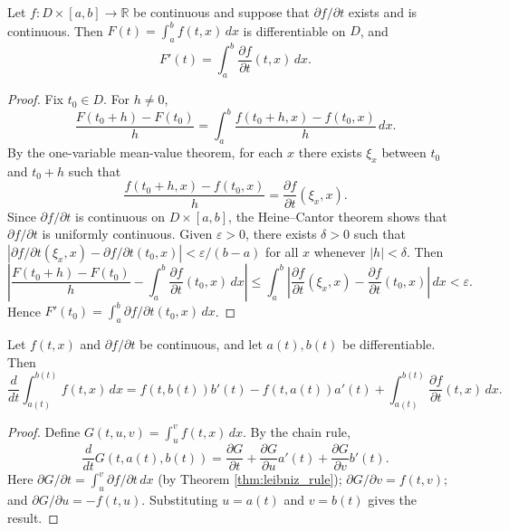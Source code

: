 \begin{theorem}\label{thm:leibniz_rule}
Let $f: D \times [a, b] \to \mathbb{R}$ be continuous and suppose that $\partial f/\partial t$ exists and is continuous. Then $F(t) = \int_a^b f(t, x) \, dx$ is differentiable on $D$, and
\[
F'(t) = \int_a^b \frac{\partial f}{\partial t}(t, x) \, dx.
\]
\end{theorem}

\begin{proof}
Fix $t_0 \in D$. For $h \neq 0$,
\[
\frac{F(t_0 + h) - F(t_0)}{h} = \int_a^b \frac{f(t_0 + h, x) - f(t_0, x)}{h} \, dx.
\]
By the one-variable mean-value theorem, for each $x$ there exists $\xi_x$ between $t_0$ and $t_0 + h$ such that
\[
\frac{f(t_0 + h, x) - f(t_0, x)}{h} = \frac{\partial f}{\partial t}(\xi_x, x).
\]
Since $\partial f/\partial t$ is continuous on $D \times [a, b]$, the Heine--Cantor theorem shows that $\partial f/\partial t$ is uniformly continuous. Given $\varepsilon > 0$, there exists $\delta > 0$ such that $|\partial f/\partial t(\xi_x, x) - \partial f/\partial t(t_0, x)| < \varepsilon/(b - a)$ for all $x$ whenever $|h| < \delta$. Then
\[
\left| \frac{F(t_0 + h) - F(t_0)}{h} - \int_a^b \frac{\partial f}{\partial t}(t_0, x) \, dx \right| \le \int_a^b \left| \frac{\partial f}{\partial t}(\xi_x, x) - \frac{\partial f}{\partial t}(t_0, x) \right| \, dx < \varepsilon.
\]
Hence $F'(t_0) = \int_a^b \partial f/\partial t(t_0, x) \, dx$.
\end{proof}

\begin{corollary}\label{cor:leibniz_variable_limits}
Let $f(t, x)$ and $\partial f/\partial t$ be continuous, and let $a(t), b(t)$ be differentiable. Then
\[
\frac{d}{dt} \int_{a(t)}^{b(t)} f(t, x) \, dx = f(t, b(t)) b'(t) - f(t, a(t)) a'(t) + \int_{a(t)}^{b(t)} \frac{\partial f}{\partial t}(t, x) \, dx.
\]
\end{corollary}

\begin{proof}
Define $G(t, u, v) = \int_u^v f(t, x) \, dx$. By the chain rule,
\[
\frac{d}{dt} G(t, a(t), b(t)) = \frac{\partial G}{\partial t} + \frac{\partial G}{\partial u} a'(t) + \frac{\partial G}{\partial v} b'(t).
\]
Here $\partial G/\partial t = \int_u^v \partial f/\partial t \, dx$ (by Theorem \ref{thm:leibniz_rule}); $\partial G/\partial v = f(t, v)$; and $\partial G/\partial u = -f(t, u)$. Substituting $u = a(t)$ and $v = b(t)$ gives the result.
\end{proof}

